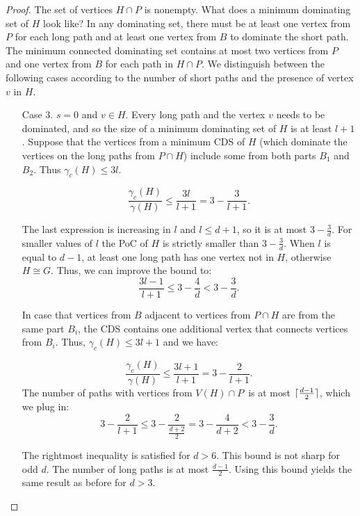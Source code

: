 \begin{proof}
		The set of vertices \(H \cap P\) is nonempty. What does a minimum dominating set of \(H\) look like?
		In any dominating set, there must be at least one vertex from \(P\) for each long path and at least one vertex from \(B\) to dominate the short path.
		The minimum connected dominating set contains at most two vertices from \(P\) and one vertex from \(B\) for each path in \(H \cap P\).
		We distinguish between the following cases according to the number of short paths and the presence of vertex \(v\) in \(H\).
	\begin{enumerate}
		\item[Case 3.] \(s = 0\) and \(v \in H\).
                Every long path and the vertex \(v\) needs to be dominated, and so the size of a minimum dominating set of \(H\) is at least \(l + 1\).
                Suppose that the vertices from a minimum CDS of \(H\) (which dominate the vertices on the long paths from \(P \cap H\))
                include some from both parts \(B_1\) and \(B_2\).
		Thus \(\gamma_c(H) \leq 3l\).

		\[\frac{\gamma_c(H)}{\gamma(H)} \leq {\frac{3l}{l + 1}} = {3 - \frac{3}{l + 1}}.\]\label{case3s=0a}

		The last expression is increasing in \(l\) and \(l \leq d + 1\), so it is at most \(3 - \frac{3}{d}\).
		For smaller values of \(l\) the PoC of \(H\) is strictly smaller than \(3 - \frac{3}{d}\).
		When \(l\) is equal to \(d - 1\), at least one long path has one vertex not in \(H\), otherwise \(H \cong G\).
		Thus, we can improve the bound to:
		\[\frac{3l - 1}{l + 1} \leq {3 - \frac{4}{d}} < {3 - \frac{3}{d}}.\]\label{case3s=0b}

		In case that vertices from \(B\) adjacent to vertices from \(P \cap H\) are from the same part \(B_i\),
		the CDS contains one additional vertex that connects vertices from \(B_i\).
		Thus,  \(\gamma_c(H) \leq 3l + 1\) and we have:
		
		\[\frac{\gamma_c(H)}{\gamma(H)} \leq {\frac{3l + 1}{l + 1}} = {3 - \frac{2}{l + 1}}.\]	
		The number of paths with vertices from \(V(H) \cap P\)\ is at most \(\lceil\frac{d - 1}{2}\rceil\), which we plug in:
		\[{3 - \frac{2}{l + 1}} \leq {3 - \frac{2}{\frac{d + 2}{2}}} = {3 - {\frac{4}{d + 2}}} < 3 - \frac{3}{d}.\]

		The rightmost inequality is satisfied for \(d > 6\).
		This bound is not sharp for odd \(d\).
		The number of long paths is at most \(\frac{d-1}{2}\). 
		Using this bound yields the same result as before for \(d > 3\).
	

\end{enumerate}
\end{proof}
